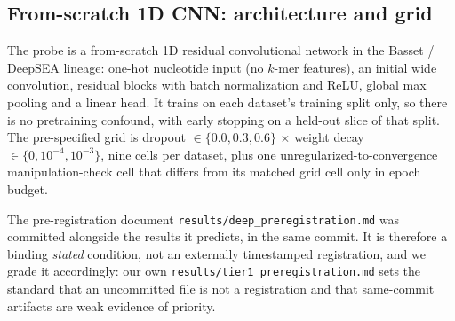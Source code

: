 \documentclass[11pt,a4paper]{article}
\begin{document}
\begin{table}[htbp]
\centering
\caption{Nine-model roster on \textit{human\_enhancers\_ensembl}, full scale, as-shipped versus
near-duplicate-aware split. Gap$_{\text{bal}}$ is the graded memorization gap computed from
\emph{balanced} accuracy within each stratum and is the statistic relied on; Gap$_{\text{raw}}$ is
the uncorrected accuracy difference, shown only for comparison because it is confounded by stratum
class composition---a constant classifier scores $+0.803$ on this dataset, which is why the raw
column carries two large negative values that do not indicate ``negative memorization''. The
corrected column orders the models as the memorization account predicts and the raw column does
not. ``Drop'' is the accuracy lost under correction, with a two-arm cluster-bootstrap interval;
$^{*}$ marks intervals excluding zero. Models are ordered by as-shipped rank. The top three
as-shipped finish within $0.0015$ of one another---a tie---yet span $23$ points on the corrected
split, and the corrected winner is the linear SVM. Generated from
\texttt{results/roster\_rankings.csv}; the prevalence-corrected gaps are exploratory
(main text \S3.7).\label{tab:roster}}
\footnotesize\setlength{\tabcolsep}{3pt}
\end{table}

\subsection{From-scratch 1D CNN: architecture and grid}\label{sec:s-cnn}
The probe is a from-scratch 1D residual convolutional network in the Basset
\citep{kelley2016basset} / DeepSEA \citep{zhou2015deepsea} lineage: one-hot nucleotide input (no
$k$-mer features), an initial wide convolution, residual blocks with batch normalization and ReLU,
global max pooling and a linear head. It trains on each dataset's training split only, so there is
no pretraining confound, with early stopping on a held-out slice of that split. The pre-specified
grid is dropout $\in\{0.0,0.3,0.6\}$ $\times$ weight decay $\in\{0,10^{-4},10^{-3}\}$, nine cells
per dataset, plus one unregularized-to-convergence manipulation-check cell that differs from its
matched grid cell only in epoch budget.

The pre-registration document \texttt{results/deep\_preregistration.md} was committed alongside the
results it predicts, in the same commit. It is therefore a binding \emph{stated} condition, not an
externally timestamped registration, and we grade it accordingly: our own
\texttt{results/tier1\_preregistration.md} sets the standard that an uncommitted file is not a
registration and that same-commit artifacts are weak evidence of priority.
\end{document}

